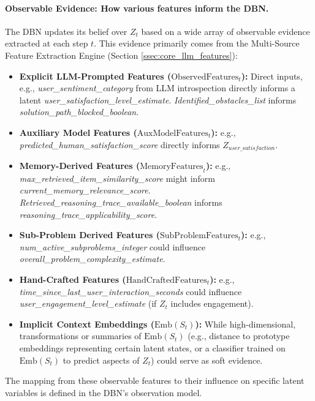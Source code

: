 \documentclass[11pt]{article}
\begin{document}
\paragraph{Observable Evidence: How various features inform the DBN.}
The DBN updates its belief over $Z_t$ based on a wide array of observable evidence extracted at each step $t$. This evidence primarily comes from the Multi-Source Feature Extraction Engine (Section \ref{ssec:core_llm_features}):
\begin{itemize}
    \item \textbf{Explicit LLM-Prompted Features ($\text{ObservedFeatures}_t$):} Direct inputs, e.g., \emph{user_sentiment_category} from LLM introspection directly informs a latent \emph{user_satisfaction_level_estimate}. \emph{Identified_obstacles_list} informs \emph{solution_path_blocked_boolean}.
    \item \textbf{Auxiliary Model Features ($\text{AuxModelFeatures}_t$):} e.g., \emph{predicted_human_satisfaction_score} directly informs $Z_{user\_satisfaction}$.
    \item \textbf{Memory-Derived Features ($\text{MemoryFeatures}_t$):} e.g., \emph{max_retrieved_item_similarity_score} might inform \emph{current_memory_relevance_score}. \emph{Retrieved_reasoning_trace_available_boolean} informs \emph{reasoning_trace_applicability_score}.
    \item \textbf{Sub-Problem Derived Features ($\text{SubProblemFeatures}_t$):} e.g., \emph{num_active_subproblems_integer} could influence \emph{overall_problem_complexity_estimate}.
    \item \textbf{Hand-Crafted Features ($\text{HandCraftedFeatures}_t$):} e.g., \emph{time_since_last_user_interaction_seconds} could influence \emph{user_engagement_level_estimate} (if $Z_t$ includes engagement).
    \item \textbf{Implicit Context Embeddings ($\text{Emb}(S_t)$):} While high-dimensional, transformations or summaries of $\text{Emb}(S_t)$ (e.g., distance to prototype embeddings representing certain latent states, or a classifier trained on $\text{Emb}(S_t)$ to predict aspects of $Z_t$) could serve as soft evidence.
\end{itemize}
The mapping from these observable features to their influence on specific latent variables is defined in the DBN's observation model.
\end{document}
